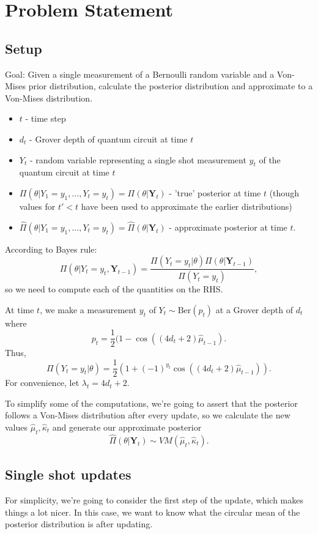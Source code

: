 \documentclass[]{report}
\begin{document}
\chapter{Problem Statement}
\section{Setup}
Goal: Given a single measurement of a Bernoulli random variable and a Von-Mises prior distribution, calculate the posterior distribution and approximate to a Von-Mises distribution.

\begin{itemize}
	\item $t$ - time step
	\item $d_t$ - Grover depth of quantum circuit at time $t$
	\item $Y_t$ - random variable representing a single shot measurement $y_t$ of the quantum circuit at time $t$
	\item $\Pi(\theta| Y_1 = y_1, \ldots, Y_t = y_t) = \Pi(\theta | \mathbf{Y}_t )$ - 'true' posterior at time $t$ (though values for $t ' < t$ have been used to approximate the earlier distributions)
	\item  $\hat{\Pi}(\theta| Y_1 = y_1, \ldots, Y_t = y_t) = \hat{\Pi}(\theta | \mathbf{Y}_t )$ - approximate posterior at time $t$.
\end{itemize}

According to Bayes rule:
\[
\Pi (\theta | Y_t = y_t, \mathbf{Y}_{t -1}) = \frac{\Pi(Y_t = y_t | \theta) \Pi(\theta | \mathbf{Y}_{t-1})}{\Pi(Y_t = y_t) },
\]
so we need to compute each of the quantities on the RHS.

At time $t$, we make a measurement $y_t$ of $Y_t \sim \text{Ber}(p_t)$ at a Grover depth of $d_t$ where
\[
	p_t = \frac{1}{2}(1 - \cos((4d_t + 2) \hat{\mu}_{t-1}).
\]
Thus,
\[
\Pi(Y_t = y_t | \theta) =  \frac{1}{2}(1 + (-1)^{y_t} \cos((4d_t + 2) \hat{\mu}_{t-1})).
\]
For convenience, let $\lambda_t = 4d_t + 2$.

To simplify some of the computations, we're going to assert that the posterior follows a Von-Mises distribution after every update, so we calculate the new values $\hat{\mu}_t, \hat{\kappa}_t$ and generate our approximate posterior
\[
\hat{\Pi}(\theta | \mathbf{Y}_t )  \sim VM(\hat{\mu}_t, \hat{\kappa}_t).
\]
\section{Single shot updates}
For simplicity, we're going to consider the first step of the update, which makes things a lot nicer. In this case, we want to know what the circular mean of the posterior distribution is after updating.
\end{document}
